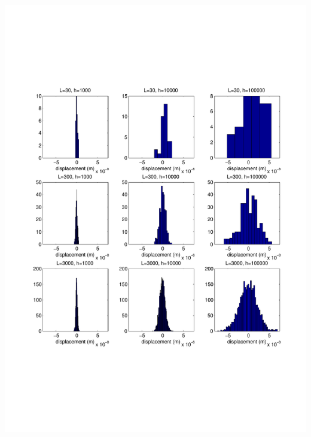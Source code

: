 \documentclass[12pt]{article}
\begin{document}
\newpage\section{}

\includegraphics[width=\textwidth]{m/Exercise_4.pdf} 
\end{document}
